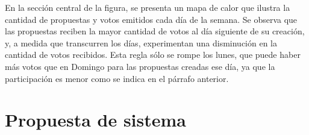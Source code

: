 En la sección central de la figura, se presenta un mapa de calor que ilustra la cantidad de propuestas y votos emitidos cada día de la semana. Se observa que las propuestas reciben la mayor cantidad de votos al día siguiente de su creación, y, a medida que transcurren los días, experimentan una disminución en la cantidad de votos recibidos. Esta regla sólo se rompe los lunes, que puede haber más votos que en Domingo para las propuestas creadas ese día, ya que la participación es menor como se indica en el párrafo anterior.

\section{Propuesta de sistema}


